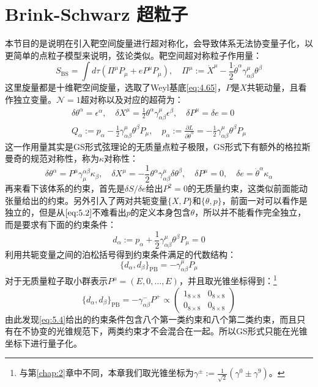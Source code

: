 \section{Brink-Schwarz 超粒子}
本节目的是说明在引入靶空间旋量进行超对称化，会导致体系无法协变量子化，以更简单的点粒子模型来说明，弦论类似。靶空间超对称粒子作用量：\cite{Brink:1981nb,Ferber:1977qx}
\begin{equation}
	\label{eq:5.1}
	S_{\text{BS}}=\int d\tau\left(\Pi^\mu P_\mu+eP^\mu P_\mu\right),\quad\Pi^\mu:=\dot{X}^\mu-\frac{1}{2}\dot{\theta}^\alpha\gamma_{\alpha\beta}^\mu\theta^\beta
\end{equation}
这里旋量都是十维靶空间旋量，选取了Weyl基底\ref{eq:4.65}，$P$是$X$共轭动量，且看作独立变量。$\mathcal{N}=1$超对称以及对应的超荷为：
\begin{equation}
	\label{eq:5.2}
	\begin{gathered}
		\delta\theta^\alpha=\epsilon^\alpha,\quad\delta X^\mu=\frac{1}{2}\theta^\alpha\gamma_{\alpha\beta}^\mu\epsilon^\beta,\quad\delta P^\mu=\delta e=0\\
		Q_\alpha:=p_\alpha-\frac{1}{2}\gamma_{\alpha\beta}^\mu\theta^\beta P_\mu,\quad p_\alpha:=\frac{\partial L}{\partial\dot{\theta}^\alpha}=-\frac{1}{2}\gamma_{\alpha\beta}^\mu\theta^\beta P_\mu
	\end{gathered}
\end{equation}
这一作用量其实是GS形式弦理论的无质量点粒子极限，GS形式下有额外的格拉斯曼奇的规范对称性，称为$\kappa$对称性：
\begin{equation}
	\delta\theta^\alpha=P^\mu\gamma_\mu^{\alpha\beta}\kappa_\beta,\quad\delta X^\mu=-\frac{1}{2}\theta^\alpha\gamma_{\alpha\beta}^\mu\delta\theta^\beta,\quad\delta P^\mu=0,\quad\delta e=\dot{\theta}^\alpha\kappa_\alpha
\end{equation}
再来看下该体系的约束，首先是$\delta S/\delta e$给出$P^2=0$的无质量约束，这类似前面能动张量给出的约束。另外引入了两对共轭变量$\{X,P\}$和$\{\theta,p\}$，前面一对可以看作是独立的，但是从$\ref{eq:5.2}$不难看出$p$的定义本身包含$\theta$，所以并不能看作完全独立，而是要求有下面的约束条件：
\begin{equation}
	d_\alpha:=p_\alpha+\frac{1}{2}\gamma_{\alpha\beta}^\mu\theta^\beta P_\mu=0
\end{equation}
利用共轭变量之间的泊松括号得到约束条件满足的代数结构：
\begin{equation}
	\label{eq:5.4}
	\{d_\alpha,d_\beta\}_{\mathrm{PB}}=-\gamma_{\alpha\beta}^\mu P_\mu
\end{equation}
对于无质量粒子取小群表示$P^\mu=(E,0,\ldots,E)$，并且取光锥坐标得到：\footnote{与第\ref{chap:2}章中不同，本章我们取光锥坐标为$\gamma^{\pm}:=\frac{1}{\sqrt{2}}(\gamma^0\pm\gamma^9)$。}
\begin{equation}
	\label{eq:5.5}
	\{d_\alpha,d_\beta\}_{\mathrm{PB}}=-\gamma_{\alpha\beta}^-P^+\propto\begin{pmatrix}{1}_{8\times8}&{0}_{8\times8}\\{0}_{8\times8}&{0}_{8\times8}\end{pmatrix}
\end{equation}
由此发现\ref{eq:5.4}给出的约束条件包含八个第一类约束和八个第二类约束，而且只有在不协变的光锥规范下，两类约束才不会混合在一起。所以GS形式只能在光锥坐标下进行量子化。

